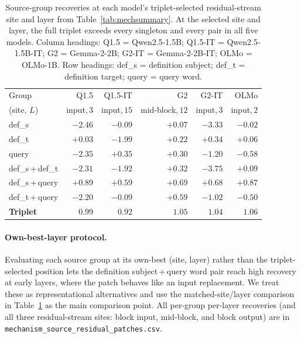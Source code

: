 \documentclass[11pt]{article}
\begin{document}
\begin{table}[H]
\centering
\scriptsize
\setlength{\tabcolsep}{2pt}
\begin{tabular*}{\columnwidth}{@{\extracolsep{\fill}}lrrrrr@{}}
\toprule
Group & Q1.5 & Q1.5-IT & G2 & G2-IT & OLMo \\
(site, $L$) & input,$\,3$ & input,$\,15$ & mid-block,$\,12$ & input,$\,3$ & input,$\,2$ \\
\midrule
def\_s                            & $-2.46$ & $-0.09$ & $+0.07$ & $-3.33$ & $-0.02$ \\
def\_t                            & $+0.03$ & $-1.99$ & $+0.22$ & $+0.34$ & $+0.06$ \\
query                             & $-2.35$ & $+0.35$ & $+0.30$ & $-1.20$ & $-0.58$ \\
def\_s\,+\,def\_t                 & $-2.31$ & $-1.92$ & $+0.32$ & $-3.75$ & $+0.09$ \\
def\_s\,+\,query                  & $+0.89$ & $+0.59$ & $+0.69$ & $+0.68$ & $+0.87$ \\
def\_t\,+\,query                  & $-2.20$ & $-0.09$ & $+0.59$ & $-1.02$ & $-0.50$ \\
\textbf{Triplet}                  & $\mathbf{0.99}$ & $\mathbf{0.92}$ & $\mathbf{1.05}$ & $\mathbf{1.04}$ & $\mathbf{1.06}$ \\
\bottomrule
\end{tabular*}
\caption{Source-group recoveries at each model's triplet-selected residual-stream site and
layer from Table~\ref{tab:mechsummary}. At the selected site and layer, the full triplet
exceeds every singleton and every pair in all five models. Column headings: Q1.5 =
Qwen2.5-1.5B; Q1.5-IT = Qwen2.5-1.5B-IT; G2 = Gemma-2-2B; G2-IT = Gemma-2-2B-IT; OLMo =
OLMo-1B. Row headings: def\_s = definition subject; def\_t = definition target; query =
query word.}
\label{tab:source_group_recovery}
\end{table}

\paragraph{Own-best-layer protocol.}
Evaluating each source group at its own-best (site, layer) rather than the triplet-selected
position lets the definition subject\,+\,query word pair reach high recovery at early layers,
where the patch behaves like an input replacement. We treat these as representational
alternatives and use the matched-site/layer comparison in
Table~\ref{tab:source_group_recovery} as the main comparison point. All per-group per-layer
recoveries (and all three residual-stream sites: block input, mid-block, and block output)
are in \texttt{mechanism\_source\_residual\_\allowbreak patches.csv}.
\end{document}

